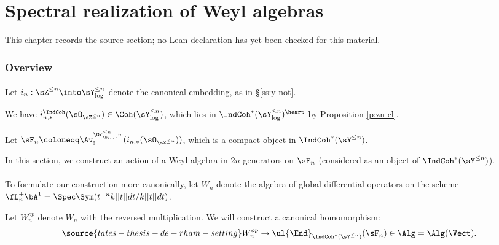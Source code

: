 \chapter{Spectral realization of Weyl algebras}
\label{tates-thesis-de-rham-setting-chapter-05}

\begin{remark}
\label{tates-thesis-de-rham-setting-chapter-05-source}
This chapter records the source section; no Lean declaration has yet been checked for this material.
\notready
\end{remark}

\label{s:weyl}

\subsection{Overview}

\subsubsection{}

Let $i_n:\sZ^{\leq n} \into \sY_{\log}^{\leq n}$ denote the
canonical embedding, as in \S \ref{ss:y-not}.

We have $i_{n,*}^{\IndCoh}(\sO_{\sZ^{\leq n}}) \in \Coh(\sY_{\log}^{\leq n})$,
which lies in $\IndCoh^*(\sY_{\log}^{\leq n})^{\heart}$ by
Proposition \ref{p:zn-cl}.

Let $\sF_n \coloneqq
\Av_!^{\Gr_{\bG_m}^{\leq n},w}
(i_{n,*}(\sO_{\sZ^{\leq n}}))$, which is a compact object in $\IndCoh^*(\sY^{\leq n})$.

In this section, we construct an action of
a Weyl algebra in $2n$ generators on $\sF_n$ (considered as an object of
$\IndCoh^*(\sY^{\leq n})$).

\subsubsection{}

To formulate our construction more canonically, let
$W_n$ denote the algebra of global differential operators
on the scheme $\fL_n^+ \bA^1 = \Spec\Sym(t^{-n}k[[t]]dt/k[[t]]dt)$.

Let $W_n^{op}$ denote $W_n$ with the reversed multiplication.
We will construct a canonical homomorphism:
%
\begin{equation}\label{eq:action}
\source{tates-thesis-de-rham-setting}
W_n^{op} \to \ul{\End}_{\IndCoh^*(\sY^{\leq n})}(\sF_n) \in \Alg = \Alg(\Vect).
\end{equation}

